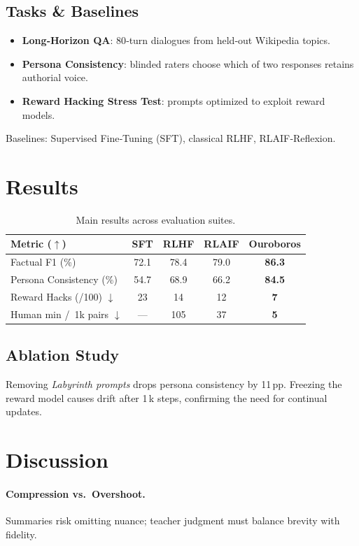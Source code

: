 \documentclass[11pt]{article}
\begin{document}
\subsection{Tasks \& Baselines}
\begin{itemize}
    \item \textbf{Long‑Horizon QA}: 80‑turn dialogues from held‑out Wikipedia topics.
    \item \textbf{Persona Consistency}: blinded raters choose which of two responses retains authorial voice.
    \item \textbf{Reward Hacking Stress Test}: prompts optimized to exploit reward models.
\end{itemize}
Baselines: Supervised Fine‑Tuning (SFT), classical RLHF, RLAIF‑Reflexion.

\section{Results}
\begin{table}[h]
\centering
\begin{tabular}{lcccc}
\toprule
\textbf{Metric} ($\uparrow$) & \textbf{SFT} & \textbf{RLHF} & \textbf{RLAIF} & \textbf{Ouroboros}\\
\midrule
Factual F1 (\%)    & 72.1 & 78.4 & 79.0 & \textbf{86.3}\\
Persona Consistency (\%) & 54.7 & 68.9 & 66.2 & \textbf{84.5}\\
Reward Hacks (/100) $\downarrow$ & 23 & 14 & 12 & \textbf{7}\\
Human min / 1k pairs $\downarrow$ & --- & 105 & 37 & \textbf{5}\\
\bottomrule
\end{tabular}
\caption{Main results across evaluation suites.}
\label{tab:results}
\end{table}

\subsection{Ablation Study}
Removing \emph{Labyrinth prompts} drops persona consistency by 11 pp.  Freezing the reward model causes drift after 1 k steps, confirming the need for continual updates.

\section{Discussion}
\paragraph{Compression vs.\ Overshoot.} Summaries risk omitting nuance; teacher judgment must balance brevity with fidelity.%
\end{document}

